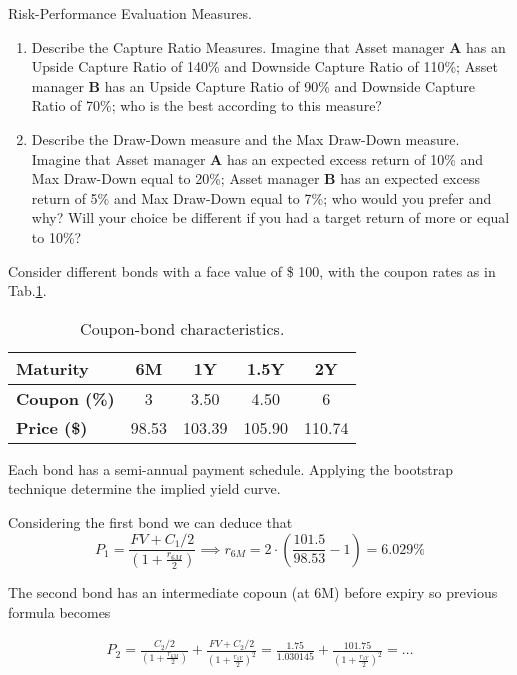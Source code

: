 \documentclass[12pt,a4paper]{exam}
\begin{document}
\begin{questions}
\question Risk-Performance Evaluation Measures.
\begin{enumerate}
\item Describe the Capture Ratio Measures. Imagine that Asset manager \textbf{A} has an Upside Capture Ratio of 140\% and Downside Capture Ratio of 110\%; Asset manager \textbf{B} has an Upside Capture Ratio of 90\% and Downside Capture Ratio of 70\%; who is the best according to this measure?
\item Describe the Draw-Down measure and the Max Draw-Down measure. Imagine that Asset manager \textbf{A} has an expected excess return of 10\% and Max Draw-Down equal to 20\%; Asset manager \textbf{B} has an expected excess return of 5\% and Max Draw-Down equal to 7\%; who would you prefer and why? Will your choice be different if you had a target return of more or equal to 10\%?
\end{enumerate}
\fillwithlines{3cm}


\question Consider different bonds with a face value of \$ 100, with the coupon rates as in Tab.\ref{tab:coupons}.

\begin{table}[htb]
  \begin{center}
    \begin{tabular}{|l|c|c|c|c|}
      \hline
      \textbf{Maturity}    & 6M    & 1Y     & 1.5Y   & 2Y  \\ \hline
      \textbf{Coupon (\%)} & 3     & 3.50   & 4.50   & 6 \\ \hline
      \textbf{Price (\$)}  & 98.53 & 103.39 & 105.90 & 110.74 \\ \hline
    \end{tabular}
    \end{center}
    \caption{Coupon-bond characteristics.}
    \label{tab:coupons}
  \end{table}
Each bond has a semi-annual payment schedule. Applying the bootstrap technique determine the implied yield curve.
\fillwithlines{3cm}
\begin{solution}
Considering the first bond we can deduce that
\begin{equation*}
  P_1 = \frac{FV + C_1/2}{(1+\frac{r_{6M}}{2})} \implies r_{6M} = 2\cdot \left(\frac{101.5}{98.53}-1\right) = 6.029\%
\end{equation*}

The second bond has an intermediate copoun (at 6M) before expiry so previous formula becomes

\begin{equation*}
  \begin{gathered}
    P_2 = \frac{C_2/2}{(1+\frac{r_{6M}}{2})} + \frac{FV + C_2/2}{(1+\frac{r_{1Y}}{2})^2} = \frac{1.75}{1.030145} + \frac{101.75}{(1+\frac{r_{1Y}}{2})^2} = \ldots
  \end{gathered}
\end{equation*}


\end{solution}
\end{questions}
\end{document}
